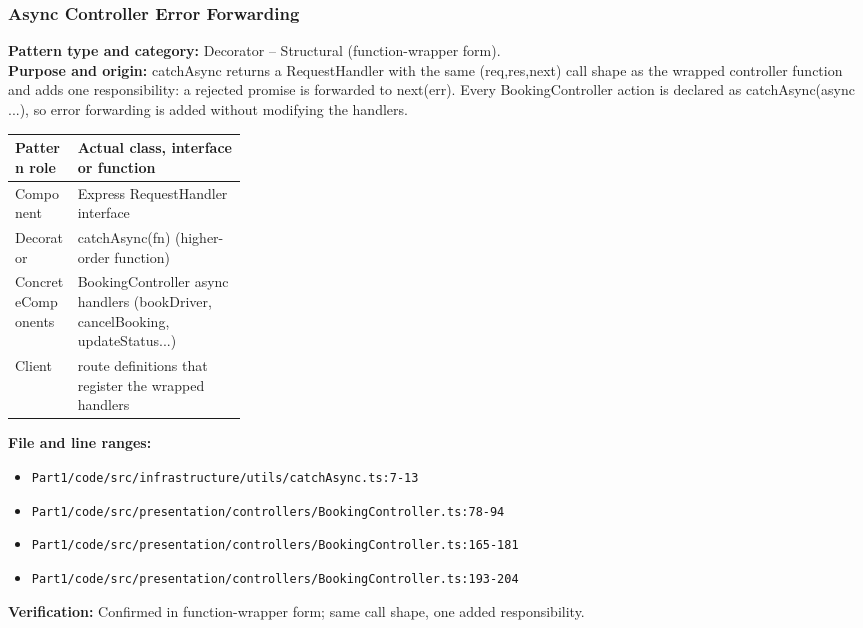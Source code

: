 \documentclass[11pt,a4paper]{article}
\begin{document}
\subsubsection*{Async Controller Error Forwarding}
\textbf{Pattern type and category:} Decorator -- Structural (function-wrapper form).\\
\textbf{Purpose and origin:} catchAsync returns a RequestHandler with the same (req,res,next) call shape as the wrapped controller function and adds one responsibility: a rejected promise is forwarded to next(err). Every BookingController action is declared as catchAsync(async ...), so error forwarding is added without modifying the handlers.

\noindent\begin{tabularx}{\linewidth}{@{}P{0.27\linewidth}Y@{}}
\toprule Pattern role & Actual class, interface or function \\ \midrule
Component & Express RequestHandler interface \\
Decorator & catchAsync(fn) (higher-order function) \\
ConcreteComponents & BookingController async handlers (bookDriver, cancelBooking, updateStatus...) \\
Client & route definitions that register the wrapped handlers \\
\bottomrule
\end{tabularx}

\noindent\textbf{File and line ranges:}\begin{itemize}\setlength\itemsep{0pt}\item \texttt{Part1/\allowbreak{}code/\allowbreak{}src/\allowbreak{}infrastructure/\allowbreak{}utils/\allowbreak{}catchAsync.\allowbreak{}ts:7-13}\item \texttt{Part1/\allowbreak{}code/\allowbreak{}src/\allowbreak{}presentation/\allowbreak{}controllers/\allowbreak{}BookingController.\allowbreak{}ts:78-94}\item \texttt{Part1/\allowbreak{}code/\allowbreak{}src/\allowbreak{}presentation/\allowbreak{}controllers/\allowbreak{}BookingController.\allowbreak{}ts:165-181}\item \texttt{Part1/\allowbreak{}code/\allowbreak{}src/\allowbreak{}presentation/\allowbreak{}controllers/\allowbreak{}BookingController.\allowbreak{}ts:193-204}\end{itemize}
\noindent\textbf{Verification:} Confirmed in function-wrapper form; same call shape, one added responsibility.


\end{document}
